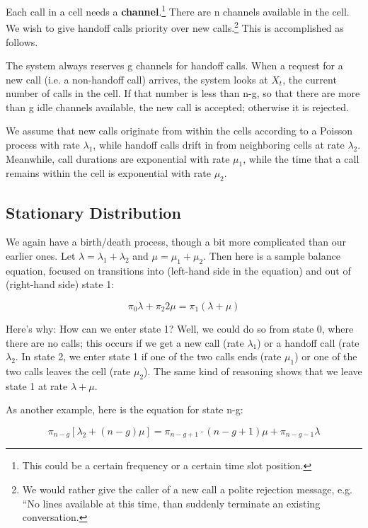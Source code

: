 Each call in a cell needs a {\bf channel}.\footnote{This could be a
certain frequency or a certain time slot position.} There are n channels
available in the cell.  We wish to give handoff calls priority over new
calls.\footnote{We would rather give the caller of a new call a polite
rejection message, e.g. ``No lines available at this time, than suddenly
terminate an existing conversation.}  This is accomplished as follows.

The system always reserves g channels for handoff calls.  When a request
for a new call (i.e. a non-handoff call) arrives, the system looks at
$X_t$, the current number of calls in the cell.  If that number is less
than n-g, so that there are more than g idle channels available, the new
call is accepted; otherwise it is rejected.

We assume that new calls originate from within the cells according to a
Poisson process with rate $\lambda_1$, while handoff calls drift in from
neighboring cells at rate $\lambda_2$.  Meanwhile, call durations are
exponential with rate $\mu_1$, while the time that a call remains within
the cell is exponential with rate $\mu_2$.

\subsection{Stationary Distribution}

We again have a birth/death process, though a bit more complicated than
our earlier ones.  Let $\lambda = \lambda_1 + \lambda_2$ and $\mu =
\mu_1 + \mu_2$.  Then here is a sample balance equation, focused on
transitions into (left-hand side in the equation) and out of (right-hand
side) state 1:

\begin{equation}
\label{state1}
\pi_0 \lambda + \pi_2 2 \mu = \pi_1 (\lambda + \mu)
\end{equation}

Here's why:  How can we enter state 1?  Well, we could do so from state
0, where there are no calls; this occurs if we get a new call (rate
$\lambda_1$) or a handoff  call (rate $\lambda_2$.  In state 2, we enter
state 1 if one of the two calls ends (rate $\mu_1$) or one of the two
calls leaves the cell (rate $\mu_2$).  The same kind of reasoning shows
that we leave state 1 at rate $\lambda + \mu$. 

As another example, here is the equation for state n-g:

\begin{equation}
\label{stateng}
\pi_{n-g} [\lambda_2 + (n-g) \mu] = \pi_{n-g+1} \cdot (n-g+1) \mu +
\pi_{n-g-1} \lambda
\end{equation} 

